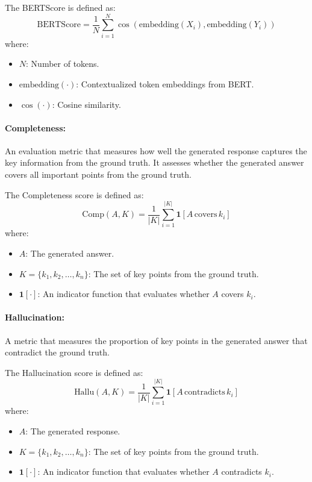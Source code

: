 \documentclass[manuscript,screen,review]{acmart}
\begin{document}
The BERTScore is defined as:
\begin{equation}
    \text{BERTScore} = \frac{1}{N} \sum_{i=1}^{N} \cos\left(\text{embedding}(X_i), \text{embedding}(Y_i)\right)
\end{equation}
where:
\begin{itemize}
    \item $N$: Number of tokens.
    \item $\text{embedding}(\cdot)$: Contextualized token embeddings from BERT.
    \item $\cos(\cdot)$: Cosine similarity.
\end{itemize}
 
 
\paragraph{\textbf{Completeness}:} An evaluation metric \cite{zhu2024ragevalscenariospecificrag} that measures how well the generated response captures the key information from the ground truth. It assesses whether the generated answer covers all important points from the ground truth. 

The Completeness score is defined as:
\begin{equation}
    \text{Comp}(A, K) = \frac{1}{|K|} \sum_{i=1}^{|K|} \mathbf{1}[A \, \text{covers} \, k_i]
\end{equation}
where:
\begin{itemize}
    \item $A$: The generated answer.
    \item $K = \{k_1, k_2, \ldots, k_n\}$: The set of key points from the ground truth.
    \item $\mathbf{1}[\cdot]$: An indicator function that evaluates whether $A$ covers $k_i$.
\end{itemize}


\paragraph{\textbf{Hallucination}:} A metric \cite{zhu2024ragevalscenariospecificrag} that measures the proportion of key points in the generated answer that contradict the ground truth.

The Hallucination score is defined as:
\begin{equation}
    \text{Hallu}(A, K) = \frac{1}{|K|} \sum_{i=1}^{|K|} \mathbf{1}[A \, \text{contradicts} \, k_i]
\end{equation}
where:
\begin{itemize}
    \item $A$: The generated response.
    \item $K = \{k_1, k_2, \ldots, k_n\}$: The set of key points from the ground truth.
    \item $\mathbf{1}[\cdot]$: An indicator function that evaluates whether $A$ contradicts $k_i$.
\end{itemize}
\end{document}
